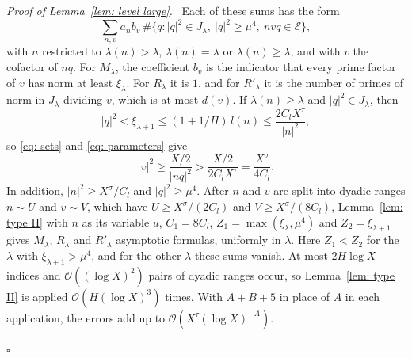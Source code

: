 \documentclass{article}
\numberwithin{equation}{section}
\newenvironment{proof}[1][Proof]{\par\medskip\noindent\textit{#1.}\ }{\hfill$\square$\par\medskip}
\newcommand{\Le}{\leqslant}
\newcommand{\Ge}{\geqslant}
\begin{document}
\begin{proof}[Proof of Lemma~\ref{lem: level large}]
Each of these sums has the form
\begin{equation*}
\sum_{n, v} a_n b_v\, \#\{q : |q|^2 \in J_\lambda,\ |q|^2 \Ge \mu^4,\ nvq \in \mathcal{E}\},
\end{equation*}
with $n$ restricted to $\lambda(n) > \lambda$, $\lambda(n) = \lambda$ or $\lambda(n) \Ge \lambda$, and with $v$ the cofactor of $nq$. For $M_\lambda$, the coefficient $b_v$ is the indicator that every prime factor of $v$ has norm at least $\xi_\lambda$. For $R_\lambda$ it is $1$, and for $R'_\lambda$ it is the number of primes of norm in $J_\lambda$ dividing $v$, which is at most $d(v)$. If $\lambda(n) \Ge \lambda$ and $|q|^2 \in J_\lambda$, then
\begin{equation*}
|q|^2 < \xi_{\lambda+1} \Le (1 + 1/H)\, l(n) \Le \frac{2C_l X^{\tau}}{|n|^2},
\end{equation*}
so \eqref{eq: sets} and \eqref{eq: parameters} give
\begin{equation*}
|v|^2 \Ge \frac{X/2}{|nq|^2} > \frac{X/2}{2C_l X^{\tau}} = \frac{X^{\sigma}}{4C_l}.
\end{equation*} In addition, $|n|^2 \Ge X^{\sigma}/C_l$ and $|q|^2 \Ge \mu^4$. After $n$ and $v$ are split into dyadic ranges $n \sim U$ and $v \sim V$, which have $U \Ge X^{\sigma}/(2C_l)$ and $V \Ge X^{\sigma}/(8C_l)$, Lemma~\ref{lem: type II} with $n$ as its variable $u$, $C_1 = 8C_l$, $Z_1 = \max(\xi_\lambda, \mu^4)$ and $Z_2 = \xi_{\lambda+1}$ gives $M_\lambda$, $R_\lambda$ and $R'_\lambda$ asymptotic formulas, uniformly in $\lambda$. Here $Z_1 < Z_2$ for the $\lambda$ with $\xi_{\lambda+1} > \mu^4$, and for the other $\lambda$ these sums vanish. At most $2H \log X$ indices and $\mathcal{O}((\log X)^2)$ pairs of dyadic ranges occur, so Lemma~\ref{lem: type II} is applied $\mathcal{O}(H (\log X)^3)$ times. With $A + B + 5$ in place of $A$ in each application, the errors add up to $\mathcal{O}(X^{\tau}(\log X)^{-A})$.


\end{proof}
\end{document}
